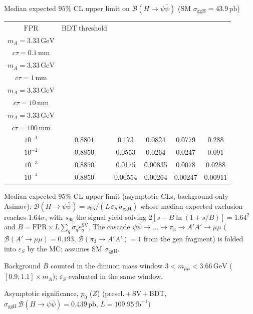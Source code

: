 \documentclass[10pt,a4paper]{article}
\begin{document}
{\vspace{12pt}

Median expected $95\%$ CL upper limit on $\mathcal{B}(H\to\psi\bar{\psi})$ (SM $\sigma_{\mathrm{ggH}}=43.9\,\mathrm{pb}$)

\begin{tabular}{cccccc}
\toprule
$\mathrm{FPR}$ & $\mathrm{BDT\ threshold}$ & \shortstack{$m_{\pi}=10\,\mathrm{GeV}$\\$m_{A}=3.33\,\mathrm{GeV}$\\$c\tau=0.1\,\mathrm{mm}$} & \shortstack{$m_{\pi}=10\,\mathrm{GeV}$\\$m_{A}=3.33\,\mathrm{GeV}$\\$c\tau=1\,\mathrm{mm}$} & \shortstack{$m_{\pi}=10\,\mathrm{GeV}$\\$m_{A}=3.33\,\mathrm{GeV}$\\$c\tau=10\,\mathrm{mm}$} & \shortstack{$m_{\pi}=10\,\mathrm{GeV}$\\$m_{A}=3.33\,\mathrm{GeV}$\\$c\tau=100\,\mathrm{mm}$} \\
\midrule
$10^{-1}$ & $0.8801$ & 0.173 & 0.0824 & 0.0779 & 0.288\\
$10^{-2}$ & $0.8850$ & 0.0553 & 0.0264 & 0.0247 & 0.091\\
$10^{-3}$ & $0.8850$ & 0.0175 & 0.00835 & 0.0078 & 0.0288\\
$10^{-4}$ & $0.8850$ & 0.00554 & 0.00264 & 0.00247 & 0.00911\\
\bottomrule
\end{tabular}

{\small Median expected $95\%$ CL upper limit (asymptotic CLs, background-only Asimov): $\mathcal{B}(H\to\psi\bar{\psi})=s_{95}/(L\,\varepsilon_S\,\sigma_{\mathrm{ggH}})$ whose median expected exclusion reaches $1.64\sigma$, with $s_{95}$ the signal yield solving $2[s-B\ln(1{+}s/B)]=1.64^2$ and $B=\mathrm{FPR}\times L\sum_q\sigma_q\varepsilon_q^{\mathrm{SV}}$. The cascade $\psi\bar{\psi}\to\ldots\to\pi_3\to A'A'\to\mu\mu$ ($\mathcal{B}(A'\to\mu\mu)=0.193$, $\mathcal{B}(\pi_3\to A'A')=1$ from the gen fragment) is folded into $\varepsilon_S$ by the MC; assumes SM $\sigma_{\mathrm{ggH}}$.}

{\small Background $B$ counted in the dimuon mass window $3<m_{\mu\mu}<3.66\,\mathrm{GeV}$ ($[0.9,1.1]\times m_A$); $\varepsilon_S$ evaluated in the same window.}

\vspace{12pt}

Asymptotic significance, $p_0$ ($Z$) (presel.\,$+$\,SV\,$+$\,BDT, $\sigma_{\mathrm{ggH}}\,\mathcal{B}(H\to\psi\bar{\psi})=0.439\,\mathrm{pb}$, $L=109.95\,\mathrm{fb}^{-1}$)

}
\end{document}
